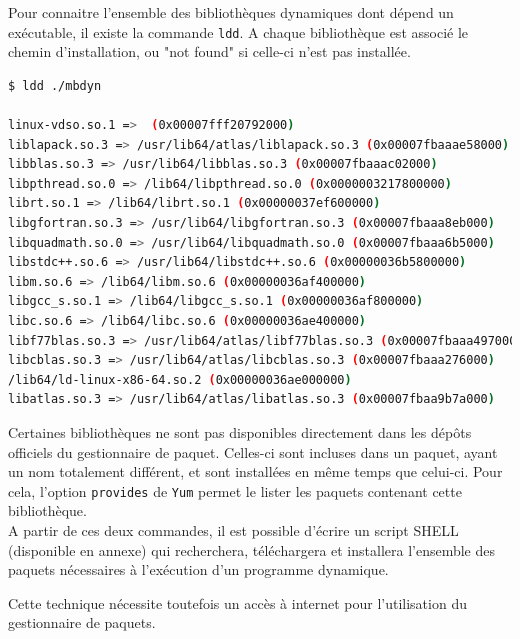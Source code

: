 Pour connaitre l'ensemble des bibliothèques dynamiques dont dépend un exécutable, il existe la commande \lstinline{ldd}.
A chaque bibliothèque est associé le chemin d'installation, ou "not found" si celle-ci n'est pas installée.
\begin{lstlisting}[language = sh]
$ ldd ./mbdyn

linux-vdso.so.1 =>  (0x00007fff20792000)
liblapack.so.3 => /usr/lib64/atlas/liblapack.so.3 (0x00007fbaaae58000)
libblas.so.3 => /usr/lib64/libblas.so.3 (0x00007fbaaac02000)
libpthread.so.0 => /lib64/libpthread.so.0 (0x0000003217800000)
librt.so.1 => /lib64/librt.so.1 (0x00000037ef600000)
libgfortran.so.3 => /usr/lib64/libgfortran.so.3 (0x00007fbaaa8eb000)
libquadmath.so.0 => /usr/lib64/libquadmath.so.0 (0x00007fbaaa6b5000)
libstdc++.so.6 => /usr/lib64/libstdc++.so.6 (0x00000036b5800000)
libm.so.6 => /lib64/libm.so.6 (0x00000036af400000)
libgcc_s.so.1 => /lib64/libgcc_s.so.1 (0x00000036af800000)
libc.so.6 => /lib64/libc.so.6 (0x00000036ae400000)
libf77blas.so.3 => /usr/lib64/atlas/libf77blas.so.3 (0x00007fbaaa497000)
libcblas.so.3 => /usr/lib64/atlas/libcblas.so.3 (0x00007fbaaa276000)
/lib64/ld-linux-x86-64.so.2 (0x00000036ae000000)
libatlas.so.3 => /usr/lib64/atlas/libatlas.so.3 (0x00007fbaa9b7a000)
\end{lstlisting}

Certaines bibliothèques ne sont pas disponibles directement dans les dépôts officiels du gestionnaire de paquet.
Celles-ci sont incluses dans un paquet, ayant un nom totalement différent, et sont installées en même temps que celui-ci.
Pour cela, l'option \lstinline{provides} de \lstinline{Yum} permet le lister les paquets contenant cette bibliothèque.
\\


A partir de ces deux commandes, il est possible d'écrire un script SHELL (disponible en annexe) qui recherchera, téléchargera et installera l'ensemble des paquets nécessaires à l'exécution d'un programme dynamique.

Cette technique nécessite toutefois un accès à internet pour l'utilisation du gestionnaire de paquets.
\\





